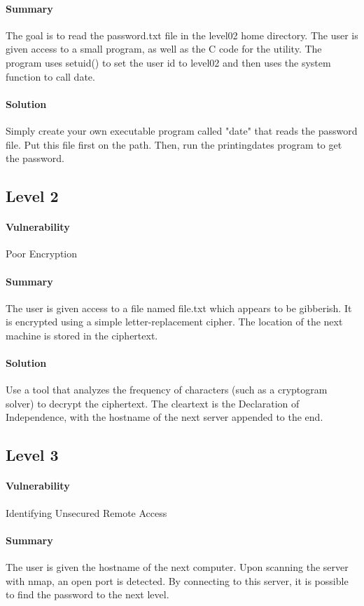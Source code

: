 \documentclass[12pt]{article}
\begin{document}
\paragraph{Summary} The goal is to read the password.txt file in the level02
home directory. The user is given access to a small program, as well as the
C code for the utility. The program uses setuid() to set the user id to level02
and then uses the system function to call date.
\paragraph{Solution} Simply create your own executable program called "date"
that reads the password file. Put this file first on the path. Then, run the
printingdates program to get the password.

\subsection{Level 2}
\paragraph{Vulnerability} Poor Encryption
\paragraph{Summary}  The user is given access to a file named file.txt which appears to be gibberish.  It is encrypted using a simple letter-replacement cipher.  The location of the next machine is stored in the ciphertext.
\paragraph{Solution} Use a tool that analyzes the frequency of characters (such as a cryptogram solver) to decrypt the ciphertext.  The cleartext is the Declaration of Independence, with the hostname of the next server appended to the end.

\subsection{Level 3}
\paragraph{Vulnerability} Identifying Unsecured Remote Access
\paragraph{Summary} The user is given the hostname of the next computer. Upon scanning the server with nmap, an open port is detected. By connecting to this server, it is possible to find the password to the next level.
\end{document}

